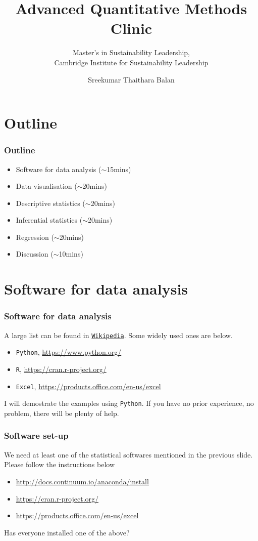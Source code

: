 \documentclass[10pt, compress]{beamer}
\title{Advanced Quantitative Methods Clinic}
\subtitle{Master’s in Sustainability Leadership,\\
Cambridge Institute for Sustainability Leadership}
\date{\displaydate{date}}
\author{Sreekumar Thaithara Balan}
\institute{Department of Physics and Astronomy,\\
University College London}
\begin{document}
\maketitle

%
\section{Outline}

\begin{frame}
    \frametitle{Outline}
    \begin{itemize}
        \item Software for data analysis ($\sim$15mins)
        \item Data visualisation ($\sim$20mins)
        \item Descriptive statistics ($\sim$20mins)
        \item Inferential statistics ($\sim$20mins)
        \item Regression ($\sim$20mins)
        \item Discussion ($\sim$10mins)
    \end{itemize}
\end{frame}

\section{Software for data analysis}

\begin{frame}[fragile]
    \frametitle{Software for data analysis}
    A large list can be found in \href{https://en.wikipedia.org/wiki/List_of_statistical_packages}{\texttt{Wikipedia}}.
    Some widely used ones are below.
    \begin{itemize}
        \item \texttt{Python}, \url{https://www.python.org/} %
        \item \texttt{R}, \url{https://cran.r-project.org/}%
        \item \texttt{Excel}, \url{https://products.office.com/en-us/excel}%
    \end{itemize}
    I will demostrate the examples using \texttt{Python}. If you have no prior
    experience, no problem, there will be plenty of help.
\end{frame}

\begin{frame}[fragile]
    \frametitle{Software set-up}
    We need at least one of the statistical softwares mentioned in the
    previous slide. Please follow the instructions below
    \begin{itemize}
        \item \url{http://docs.continuum.io/anaconda/install}%
        \item \url{https://cran.r-project.org/}%
        \item \url{https://products.office.com/en-us/excel}%
    \end{itemize}
    \smallskip
    \alert{Has everyone installed one of the above?}
\end{frame}
\end{document}
